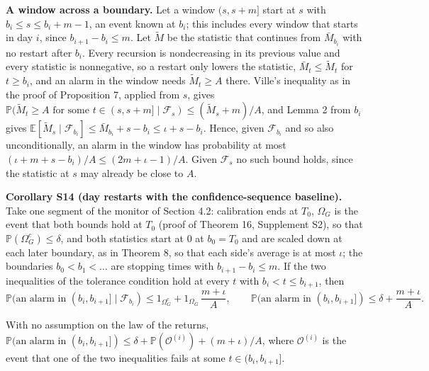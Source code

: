 \documentclass[
]{article}
\begin{document}
\textbf{A window across a boundary.} Let a window \((s, s + m]\) start
at \(s\) with \(b_i \le s \le b_i + m - 1\), an event known at \(b_i\);
this includes every window that starts in day \(i\), since
\(b_{i+1} - b_i \le m\). Let \(\tilde M\) be the statistic that
continues from \(\bar M_{b_i}\) with no restart after \(b_i\). Every
recursion is nondecreasing in its previous value and every statistic is
nonnegative, so a restart only lowers the statistic,
\(\bar M_t \le \tilde M_t\) for \(t \ge b_i\), and an alarm in the
window needs \(\tilde M_t \ge A\) there. Ville's inequality as in the
proof of Proposition 7, applied from \(s\), gives
\(\mathbb{P}(\tilde M_t \ge A \text{ for some } t \in (s, s + m] \mid \mathcal{F}_s) \le (\tilde M_s + m)/A\),
and Lemma 2 from \(b_i\) gives
\(\mathbb{E}[\tilde M_s \mid \mathcal{F}_{b_i}] \le \bar M_{b_i} + s - b_i \le \iota + s - b_i\).
Hence, given \(\mathcal{F}_{b_i}\) and so also unconditionally, an alarm
in the window has probability at most
\((\iota + m + s - b_i)/A \le (2m + \iota - 1)/A\). Given
\(\mathcal{F}_s\) no such bound holds, since the statistic at \(s\) may
already be close to \(A\).

\textbf{Corollary S14 (day restarts with the confidence-sequence
baseline).} Take one segment of the monitor of Section 4.2: calibration
ends at \(T_0\), \(\Omega_G\) is the event that both bounds hold at
\(T_0\) (proof of Theorem 16, Supplement S2), so that
\(\mathbb{P}(\Omega_G^c) \le \delta\), and both statistics start at 0 at
\(b_0 = T_0\) and are scaled down at each later boundary, as in Theorem
8, so that each side's average is at most \(\iota\); the boundaries
\(b_0 < b_1 < \dots\) are stopping times with \(b_{i+1} - b_i \le m\).
If the two inequalities of the tolerance condition hold at every \(t\)
with \(b_i < t \le b_{i+1}\), then \[
\mathbb{P}(\text{an alarm in } (b_i, b_{i+1}] \mid \mathcal{F}_{b_i}) \le 1_{\Omega_G^c} + 1_{\Omega_G}\,\frac{m + \iota}{A}, \qquad \mathbb{P}(\text{an alarm in } (b_i, b_{i+1}]) \le \delta + \frac{m + \iota}{A}.
\]

With no assumption on the law of the returns,
\(\mathbb{P}(\text{an alarm in } (b_i, b_{i+1}]) \le \delta + \mathbb{P}(\mathcal{O}^{(i)}) + (m + \iota)/A\),
where \(\mathcal{O}^{(i)}\) is the event that one of the two
inequalities fails at some \(t \in (b_i, b_{i+1}]\).
\end{document}
